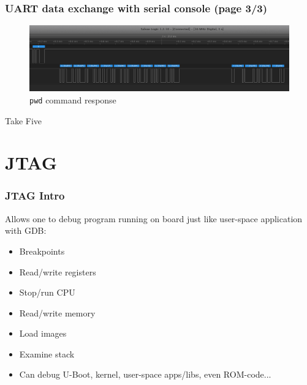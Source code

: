 \begin{frame}
  \frametitle{UART data exchange with serial console (page 3/3)}
  \begin{figure}
    \centering
    \hspace*{-8mm}\includegraphics[scale=0.5]{images/la-uart-pwd.png}\hspace*{-8mm}
    \caption{\texttt{pwd} command response}
  \end{figure}
\end{frame}

\begin{frame}[standout]
  Take Five
\end{frame}

\section{JTAG}

\begin{frame}
  \frametitle{JTAG Intro}
  Allows one to debug program running on board just like user-space application
  with GDB:
  \begin{itemize}
    \item Breakpoints
    \item Read/write registers
    \item Stop/run CPU
    \item Read/write memory
    \item Load images
    \item Examine stack
    \item Can debug U-Boot, kernel, user-space apps/libs, even ROM-code...
  \end{itemize}
\end{frame}

